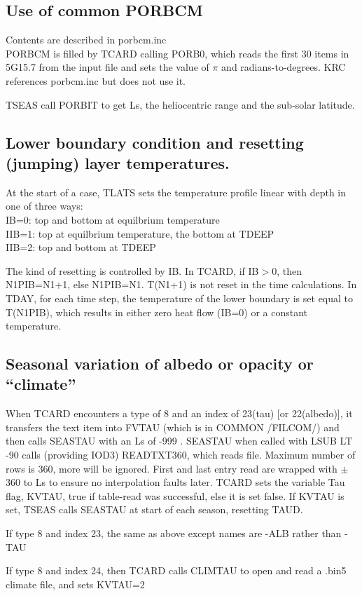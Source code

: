 \documentclass[draft]{article}  %
\newcommand{\qi}{\\ \hspace*{2.em}}      %
\begin{document}
\subsection{Use of common PORBCM}%
Contents are described in porbcm.inc \\
PORBCM is filled by TCARD calling PORB0, which reads the first 30 items in 
5G15.7 from the input file and sets the value of $\pi$ and radians-to-degrees. 
KRC references porbcm.inc but does not use it.

TSEAS call PORBIT to get Ls, the heliocentric range and the sub-solar latitude.

\subsection{Lower boundary condition and resetting (jumping) layer temperatures.} %
At the start of a case, TLATS sets the temperature profile linear with depth
in one of three ways:
\qi IB=0: top and bottom at equilbrium temperature
\qi IIB=1: top at equilbrium temperature, the bottom at TDEEP
\qi IIB=2: top and bottom at TDEEP

The kind of resetting is controlled by IB. In TCARD, if IB$>$0, then N1PIB=N1+1,
else N1PIB=N1.  T(N1+1) is not reset in the time calculations. In TDAY, for each
time step, the temperature of the lower boundary is set equal to T(N1PIB), which
results in either zero heat flow (IB=0) or a constant temperature.

\subsection{Seasonal variation of albedo or opacity or ``climate''}%

When TCARD encounters a type of 8 and an index of 23(tau) [or 22(albedo)], it
transfers the text item into FVTAU (which is in COMMON /FILCOM/) and then calls
SEASTAU with an Ls of -999 .  SEASTAU when called with LSUB LT -90 calls
(providing IOD3) READTXT360, which reads file. Maximum number of rows is 360,
more will be ignored. First and last entry read are wrapped with $\pm$360 to Ls
to ensure no interpolation faults later. TCARD sets the variable Tau flag, KVTAU,
true if table-read was successful, else it is set false.
If KVTAU is set, TSEAS calls SEASTAU at start of each season, resetting TAUD. 

If type 8 and index 23, the same as above except names are -ALB rather than -TAU

If type 8 and index 24, then TCARD calls CLIMTAU to open and read a .bin5 
climate file, and sets KVTAU=2
\end{document}
